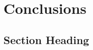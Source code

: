 \documentclass{standalone}
\begin{document}
\graphicspath{{./images/conclusion/}}%
\chapter{Conclusions}
\label{chap:conc}
\Blindtext[2]

\section{Section Heading}
\label{sec:conc:sec1}
\Blindtext[2]
\end{document}
